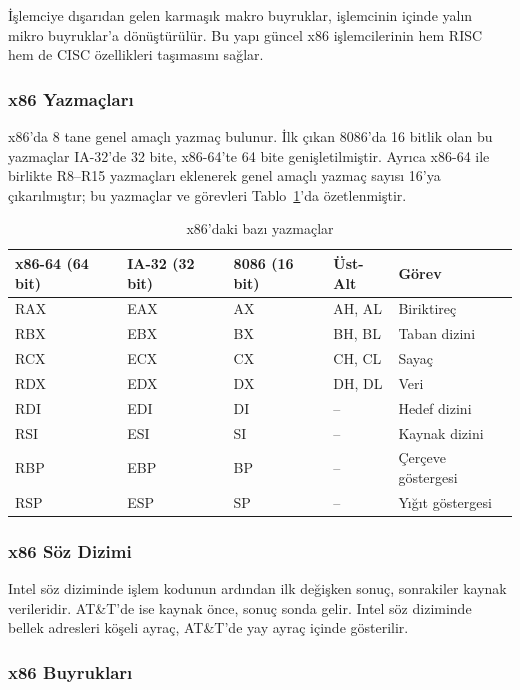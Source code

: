İşlemciye dışarıdan gelen karmaşık makro buyruklar, işlemcinin içinde yalın mikro buyruklar'a dönüştürülür. Bu yapı güncel x86 işlemcilerinin hem RISC hem de CISC özellikleri taşımasını sağlar.

\subsubsection{x86 Yazmaçları}

x86'da 8 tane genel amaçlı yazmaç bulunur. İlk çıkan 8086'da 16 bitlik olan bu yazmaçlar IA-32'de 32 bite, x86-64'te 64 bite genişletilmiştir. Ayrıca x86-64 ile birlikte R8--R15 yazmaçları eklenerek genel amaçlı yazmaç sayısı 16'ya çıkarılmıştır; bu yazmaçlar ve görevleri Tablo~\ref{tab:x86-yazmaclar}'da özetlenmiştir.

\begin{table}[H]
\centering
\caption{x86'daki bazı yazmaçlar}
\label{tab:x86-yazmaclar}
\small
\begin{tabular}{lllll}
\toprule
\textbf{x86-64 (64 bit)} & \textbf{IA-32 (32 bit)} & \textbf{8086 (16 bit)} & \textbf{Üst-Alt} & \textbf{Görev} \\
\midrule
RAX & EAX & AX & AH, AL & Biriktireç \\
RBX & EBX & BX & BH, BL & Taban dizini \\
RCX & ECX & CX & CH, CL & Sayaç \\
RDX & EDX & DX & DH, DL & Veri \\
RDI & EDI & DI & --     & Hedef dizini \\
RSI & ESI & SI & --     & Kaynak dizini \\
RBP & EBP & BP & --     & Çerçeve göstergesi \\
RSP & ESP & SP & --     & Yığıt göstergesi \\
\bottomrule
\end{tabular}
\end{table}

\subsubsection{x86 Söz Dizimi}

Intel söz diziminde işlem kodunun ardından ilk değişken sonuç, sonrakiler kaynak verileridir. AT\&T'de ise kaynak önce, sonuç sonda gelir. Intel söz diziminde bellek adresleri köşeli ayraç, AT\&T'de yay ayraç içinde gösterilir.

\subsubsection{x86 Buyrukları}

